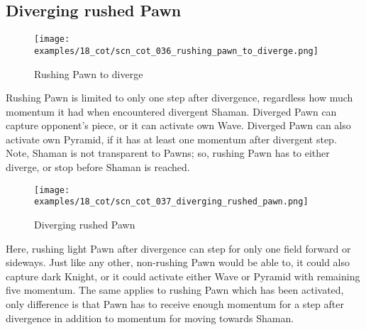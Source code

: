 \clearpage %

\subsection*{Diverging rushed Pawn}
\label{sec:Conquest of Tlalocan/Divergence/Diverging rushed Pawn}

\vspace*{-0.7\baselineskip}
\noindent
\begin{wrapfigure}[14]{l}{0.4\textwidth}
\centering
\texttt{[image: examples/18\_cot/scn\_cot\_036\_rushing\_pawn\_to\_diverge.png]}
\vspace*{-0.4\baselineskip}
\caption{Rushing Pawn to diverge}
\label{fig:scn_cot_036_rushing_pawn_to_diverge}
\end{wrapfigure}
Rushing Pawn is limited to only one step after divergence, regardless how much
momentum it had when encountered divergent Shaman. Diverged Pawn can capture
opponent's piece, or it can activate own Wave. Diverged Pawn can also activate
own Pyramid, if it has at least one momentum after divergent step.\newline
\indent
Note, Shaman is not transparent to Pawns; so, rushing Pawn has to either diverge,
or stop before Shaman is reached.

\noindent
\begin{wrapfigure}[15]{l}{0.4\textwidth}
\centering
\texttt{[image: examples/18\_cot/scn\_cot\_037\_diverging\_rushed\_pawn.png]}
\vspace*{-0.4\baselineskip}
\caption{Diverging rushed Pawn}
\label{fig:scn_cot_037_diverging_rushed_pawn}
\end{wrapfigure}
Here, rushing light Pawn after divergence can step for only one field forward or
sideways. Just like any other, non-rushing Pawn would be able to, it could also
capture dark Knight, or it could activate either Wave or Pyramid with remaining
five momentum.\newline
\indent
The same applies to rushing Pawn which has been activated, only difference is
that Pawn has to receive enough momentum for a step after divergence in addition
to momentum for moving towards Shaman.

